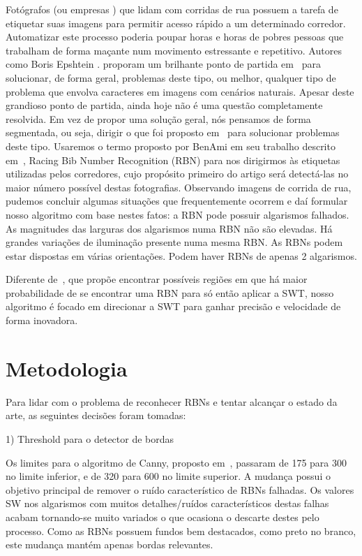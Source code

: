 \documentclass[10pt,twocolumn,letterpaper]{article}
\begin{document}
Fot\'ografos (ou empresas ) que lidam com corridas de rua possuem a tarefa de etiquetar suas imagens para 
permitir acesso r\'apido a um determinado corredor. Automatizar este processo poderia poupar horas e horas de pobres pessoas
que trabalham de forma ma\c{c}ante num movimento estressante e repetitivo. Autores como Boris Epshtein \etal. proporam um 
brilhante ponto de partida em~\cite{Swtboris} para solucionar, de forma geral, problemas deste tipo, ou melhor, qualquer 
tipo de problema que envolva caracteres em imagens com cen\'arios naturais. Apesar deste grandioso ponto de partida, ainda 
hoje n\~ao \'e uma quest\~ao completamente resolvida. Em vez de propor uma solu\c{c}\~ao geral, n\'os pensamos de forma 
segmentada, ou seja, dirigir o que foi proposto em~\cite{Swtboris} para solucionar problemas deste tipo. Usaremos o termo proposto 
por Ben\-Ami \etal em seu trabalho descrito em~\cite{Rbniban}, Racing Bib Number Recognition (RBN) para nos dirigirmos \`as 
etiquetas utilizadas pelos corredores, cujo prop\'osito primeiro do artigo ser\'a detect\'a-las no maior n\'umero poss\'ivel destas 
fotografias. Observando imagens de corrida de rua, pudemos concluir algumas situa\c{c}\~oes que frequentemente ocorrem e da\'i 
formular nosso algoritmo com base nestes fatos: a RBN pode possuir algarismos falhados. As magnitudes das larguras dos 
algarismos numa RBN n\~ao s\~ao elevadas. H\'a grandes varia\c{c}\~oes de ilumina\c{c}\~ao presente numa mesma RBN. As RBNs 
podem estar dispostas em v\'arias orienta\c{c}\~oes. Podem haver RBNs de apenas 2 algarismos.

Diferente de~\cite{Rbniban}, que prop\~oe encontrar poss\'iveis regi\~oes em que h\'a maior probabilidade de se encontrar 
uma RBN para s\'o ent\~ao aplicar a SWT, nosso algoritmo \'e focado em direcionar a SWT para ganhar precis\~ao e velocidade 
de forma inovadora.

\section{Metodologia}

Para lidar com o problema de reconhecer RBNs e tentar alcan\c{c}ar o estado da arte, as seguintes decis\~oes foram tomadas:

1) Threshold para o detector de bordas

Os limites para o algoritmo de Canny, proposto em~\cite{Canny}, passaram de 175 para 300 no limite inferior, e de 320 para 
600 no limite superior. A mudan\c{c}a possui o objetivo principal de remover o ru\'ido caracter\'istico de RBNs falhadas.
Os valores SW nos algarismos com muitos detalhes/ru\'idos caracter\'isticos destas falhas acabam tornando-se muito variados 
o que ocasiona o descarte destes pelo processo. Como as RBNs possuem fundos bem destacados, como preto no branco, este mudan\c{c}a 
mant\'em apenas bordas relevantes.
\end{document}
